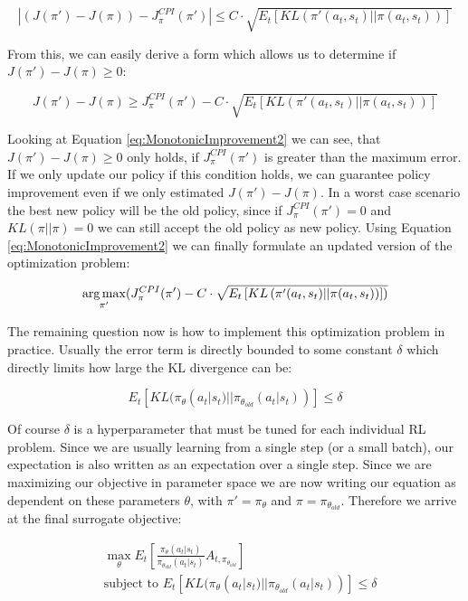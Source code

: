 \[|(J(\pi') - J(\pi)) - J^{CPI}_\pi(\pi')| \leq C \cdot \sqrt{E_t\left[KL\left(\pi'(a_t, s_t)||\pi(a_t, s_t)\right)\right]}\]

From this, we can easily derive a form which allows us to determine if $J(\pi') - J(\pi) \geq 0$:

\begin{equation} \label{eq:MonotonicImprovement2}
  J(\pi') - J(\pi) \geq J^{CPI}_\pi(\pi') - C \cdot \sqrt{E_t\left[KL\left(\pi'(a_t, s_t)||\pi(a_t, s_t)\right)\right]}
\end{equation}

Looking at Equation \ref{eq:MonotonicImprovement2} we can see, that $J(\pi') - J(\pi) \geq 0$ only holds, if $J^{CPI}_\pi(\pi')$ is greater than the maximum error. If we only update our policy if this condition holds, we can guarantee policy improvement even if we only estimated  $J(\pi') - J(\pi)$. In a worst case scenario the best new policy will be the old policy, since if $J^{CPI}_\pi(\pi') = 0$ and $KL(\pi||\pi) = 0$ we can still accept the old policy as new policy. Using Equation \ref{eq:MonotonicImprovement2} we can finally formulate an updated version of the optimization problem:

\[\operatorname*{arg\,max}_{\pi'}(J^{CPI}_\pi(\pi') - C \cdot \sqrt{E_t\left[KL\left(\pi'(a_t, s_t)||\pi(a_t, s_t)\right)\right])}\]

The remaining question now is how to implement this optimization problem in practice. Usually the error term is directly bounded to some constant $\delta$ which directly limits how large the KL divergence can be:

\[E_t[KL(\pi_\theta(a_t|s_t)||\pi_{\theta_{old}}(a_t|s_t))] \leq \delta\]

Of course $\delta$ is a hyperparameter that must be tuned for each individual RL problem. Since we are usually learning from a single step (or a small batch), our expectation is also written as an expectation over a single step. Since we are maximizing our objective in parameter space we are now writing our equation as dependent on these parameters $\theta$, with $\pi' = \pi_\theta$ and $\pi = \pi_{\theta_{old}}$. Therefore we arrive at the final surrogate objective:

\begin{align*}
  &\max_\theta E_t\left[\frac{\pi_\theta(a_t|s_t)}{\pi_{\theta_{old}}(a_t|s_t)}A_{t,\pi_{\theta_{old}}} \right] \\
  &\text{subject to } E_t[KL(\pi_\theta(a_t|s_t)||\pi_{\theta_{old}}(a_t|s_t))] \leq \delta
\end{align*}

